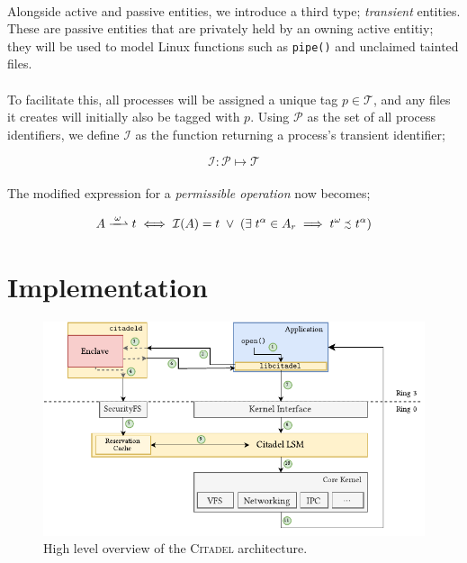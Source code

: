 \paragraph{} Alongside active and passive entities, we introduce a third type; \textit{transient} entities. These are passive entities that are privately held by an owning active entitiy; they will be used to model Linux functions such as \texttt{pipe()} and unclaimed tainted files.

\paragraph{} To facilitate this, all processes will be assigned a unique tag $p \in \mathcal{T}$, and any files it creates will initially also be tagged with $p$. Using $\mathcal{P}$ as the set of all process identifiers, we define $\mathcal{I}$ as the function returning a process's transient identifier;

\vspace{-5mm}
\begin{equation}
    \mathcal{I}: \mathcal{P} \mapsto \mathcal{T}
\end{equation}

\paragraph{} The modified expression for a \textit{permissible operation} now becomes;

\vspace{-5mm}
\begin{equation}
    A \xrightharpoonup{\;\omega\;} t \iff \mathcal{I}(A) = t \;\lor\; (\exists \; t^{\alpha} \in A_r \implies t^{\omega} \sprecsim t^{\alpha})
\end{equation}

\clearpage
\section{Implementation}

\begin{figure}[]
    \centering
    \includegraphics[width=\linewidth]{figures/OverallArchitecture.pdf}
    \caption{High level overview of the \textsc{Citadel} architecture.}
    \vspace{-5mm}
    \label{fig:citadel-overview}
    \vspace{5mm}
\end{figure}

